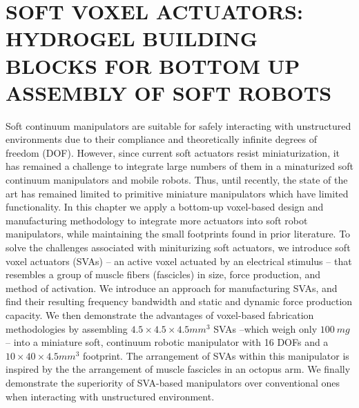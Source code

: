\graphicspath{{Images/SVAs/}}

\chapter{SOFT VOXEL ACTUATORS: HYDROGEL BUILDING BLOCKS FOR BOTTOM UP ASSEMBLY OF SOFT ROBOTS}
\label{chap:SVAs}
Soft continuum manipulators are suitable for safely interacting with unstructured environments due to their compliance and theoretically infinite degrees of freedom (DOF). However, since current soft actuators resist miniaturization, it has remained a challenge to integrate large numbers of them in a minaturized soft continuum manipulators and mobile robots. Thus, until recently, the state of the art has remained limited to primitive miniature manipulators which have limited functionality. In this chapter we apply a bottom-up voxel-based design and manufacturing methodology to integrate more actuators into soft robot manipulators, while maintaining the small footprints found in prior literature. To solve the challenges associated with miniturizing soft actuators, we introduce soft voxel actuators (SVAs) -- an active voxel actuated by an electrical stimulus -- that resembles a group of muscle fibers (fascicles) in size, force production, and method of activation. We introduce an approach for manufacturing SVAs, and find their resulting frequency bandwidth and static and dynamic force production capacity. We then demonstrate the advantages of voxel-based fabrication methodologies by assembling $4.5\times 4.5 \times4.5 mm^3$ SVAs --which weigh only $100~mg$-- into a miniature soft, continuum robotic manipulator with 16 DOFs and a $10\times 40 \times 4.5 mm^3$ footprint. The arrangement of SVAs within this manipulator is inspired by the the arrangement of muscle fascicles in an octopus arm. We finally demonstrate the superiority of SVA-based manipulators over conventional ones when interacting with unstructured environment. 
